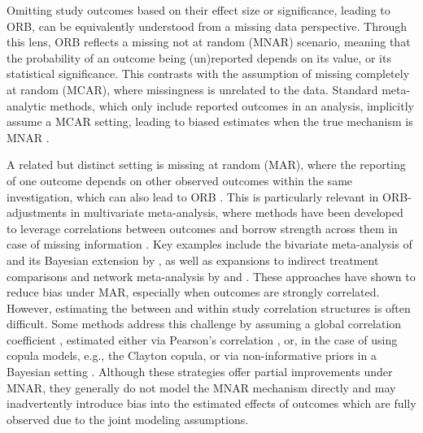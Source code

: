 \documentclass[twocolumn]{article}\usepackage[]{graphicx}\usepackage[]{xcolor}
\begin{document}
Omitting study outcomes based on their effect size or significance, leading to ORB, can be equivalently understood from a missing data perspective. Through this lens, ORB reflects a missing not at random (MNAR) scenario, meaning that the probability of an outcome being (un)reported depends on its value, or its statistical significance. This contrasts with the assumption of missing completely at random (MCAR), where missingness is unrelated to the data. Standard meta-analytic methods, which only include reported outcomes in an analysis, implicitly assume a MCAR setting, leading to biased estimates when the true mechanism is MNAR \citep{Hwang2018, Liu2017, dutch}.

A related but distinct setting is missing at random (MAR), where the reporting of one outcome depends on other observed outcomes within the same investigation, which can also lead to ORB \citep{dutch, Hwang2018, Liu2017}. This is particularly relevant in ORB-adjustments in multivariate meta-analysis, where methods have been developed to leverage correlations between outcomes and borrow strength across them in case of missing information \citep{Kirkham2012, Bay, dutch, Hwang2018, Liu2017}. Key examples include the bivariate meta-analysis of \citet{Kirkham2012} and its Bayesian extension by \citet{Bay}, as well as expansions to indirect treatment comparisons and network meta-analysis by \citet{Hwang2018} and \citet{Liu2017}. These approaches have shown to reduce bias under MAR, especially when outcomes are strongly correlated. However, estimating the between and within study correlation structures is often difficult. Some methods address this challenge by assuming a global correlation coefficient \citep{Kirkham2012, Bay, dutch, Hwang2018, RileyPG, Riley}, estimated either via Pearson’s correlation \citep{Kirkham2012, dutch}, or, in the case of \citet{Liu2017} using copula models, e.g., the Clayton copula, or via non-informative priors in a Bayesian setting \citep{Bay, Liu2017, Hwang2018}. Although these strategies offer partial improvements under MNAR, they generally do not model the MNAR mechanism directly and may inadvertently introduce bias into the estimated effects of outcomes which are fully observed due to the joint modeling assumptions.
\end{document}

